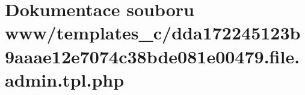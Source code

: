 \section{Dokumentace souboru www/templates\_\-c/dda172245123b9aaae12e7074c38bde081e00479.file.admin.tpl.php}
\label{d7/dd9/dda172245123b9aaae12e7074c38bde081e00479_8file_8admin_8tpl_8php}
